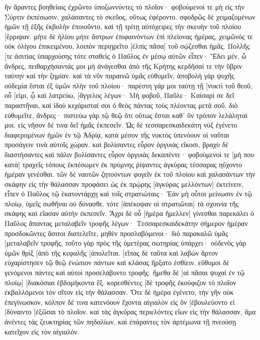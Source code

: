 ἣν ἄραντες βοηθείαις ἐχρῶντο ὑποζωννύντες τὸ πλοῖον· φοβούμενοί τε μὴ εἰς τὴν Σύρτιν ἐκπέσωσιν, χαλάσαντες τὸ σκεῦος, οὕτως ἐφέροντο. 
σφοδρῶς δὲ χειμαζομένων ἡμῶν τῇ ἑξῆς ἐκβολὴν ἐποιοῦντο, 
καὶ τῇ τρίτῃ αὐτόχειρες τὴν σκευὴν τοῦ πλοίου [ἔρριψαν. 
μήτε δὲ ἡλίου μήτε ἄστρων ἐπιφαινόντων ἐπὶ πλείονας ἡμέρας, χειμῶνός τε οὐκ ὀλίγου ἐπικειμένου, λοιπὸν περιῃρεῖτο [ἐλπὶς πᾶσα] τοῦ σῴζεσθαι ἡμᾶς. 
Πολλῆς [τε ἀσιτίας ὑπαρχούσης τότε σταθεὶς ὁ Παῦλος ἐν μέσῳ αὐτῶν εἶπεν· Ἔδει μέν, ὦ ἄνδρες, πειθαρχήσαντάς μοι μὴ ἀνάγεσθαι ἀπὸ τῆς Κρήτης κερδῆσαί τε τὴν ὕβριν ταύτην καὶ τὴν ζημίαν. 
καὶ τὰ νῦν παραινῶ ὑμᾶς εὐθυμεῖν, ἀποβολὴ γὰρ ψυχῆς οὐδεμία ἔσται ἐξ ὑμῶν πλὴν τοῦ πλοίου· 
παρέστη γάρ μοι ταύτῃ τῇ [νυκτὶ τοῦ θεοῦ, οὗ [εἰμι, ᾧ καὶ λατρεύω, [ἄγγελος 
λέγων· Μὴ φοβοῦ, Παῦλε· Καίσαρί σε δεῖ παραστῆναι, καὶ ἰδοὺ κεχάρισταί σοι ὁ θεὸς πάντας τοὺς πλέοντας μετὰ σοῦ. 
διὸ εὐθυμεῖτε, ἄνδρες· πιστεύω γὰρ τῷ θεῷ ὅτι οὕτως ἔσται καθ᾽ ὃν τρόπον λελάληταί μοι. 
εἰς νῆσον δέ τινα δεῖ ἡμᾶς ἐκπεσεῖν. 
Ὡς δὲ τεσσαρεσκαιδεκάτη νὺξ ἐγένετο διαφερομένων ἡμῶν ἐν τῷ Ἀδρίᾳ, κατὰ μέσον τῆς νυκτὸς ὑπενόουν οἱ ναῦται προσάγειν τινὰ αὐτοῖς χώραν. 
καὶ βολίσαντες εὗρον ὀργυιὰς εἴκοσι, βραχὺ δὲ διαστήσαντες καὶ πάλιν βολίσαντες εὗρον ὀργυιὰς δεκαπέντε· 
φοβούμενοί τε [μή που κατὰ] τραχεῖς τόπους ἐκπέσωμεν ἐκ πρύμνης ῥίψαντες ἀγκύρας τέσσαρας ηὔχοντο ἡμέραν γενέσθαι. 
τῶν δὲ ναυτῶν ζητούντων φυγεῖν ἐκ τοῦ πλοίου καὶ χαλασάντων τὴν σκάφην εἰς τὴν θάλασσαν προφάσει ὡς ἐκ πρῴρης [ἀγκύρας μελλόντων] ἐκτείνειν, 
εἶπεν ὁ Παῦλος τῷ ἑκατοντάρχῃ καὶ τοῖς στρατιώταις· Ἐὰν μὴ οὗτοι μείνωσιν ἐν τῷ πλοίῳ, ὑμεῖς σωθῆναι οὐ δύνασθε. 
τότε [ἀπέκοψαν οἱ στρατιῶται] τὰ σχοινία τῆς σκάφης καὶ εἴασαν αὐτὴν ἐκπεσεῖν. 
Ἄχρι δὲ οὗ [ἡμέρα ἤμελλεν] γίνεσθαι παρεκάλει ὁ Παῦλος ἅπαντας μεταλαβεῖν τροφῆς λέγων· Τεσσαρεσκαιδεκάτην σήμερον ἡμέραν προσδοκῶντες ἄσιτοι διατελεῖτε, μηθὲν προσλαβόμενοι· 
διὸ παρακαλῶ ὑμᾶς [μεταλαβεῖν τροφῆς, τοῦτο γὰρ πρὸς τῆς ὑμετέρας σωτηρίας ὑπάρχει· οὐδενὸς γὰρ ὑμῶν θρὶξ [ἀπὸ τῆς κεφαλῆς [ἀπολεῖται. 
[εἴπας δὲ ταῦτα καὶ λαβὼν ἄρτον εὐχαρίστησεν τῷ θεῷ ἐνώπιον πάντων καὶ κλάσας ἤρξατο ἐσθίειν. 
εὔθυμοι δὲ γενόμενοι πάντες καὶ αὐτοὶ προσελάβοντο τροφῆς. 
ἤμεθα δὲ [αἱ πᾶσαι ψυχαὶ ἐν τῷ πλοίῳ] [διακόσιαι ἑβδομήκοντα ἕξ. 
κορεσθέντες [δὲ τροφῆς ἐκούφιζον τὸ πλοῖον ἐκβαλλόμενοι τὸν σῖτον εἰς τὴν θάλασσαν. 
Ὅτε δὲ ἡμέρα ἐγένετο, τὴν γῆν οὐκ ἐπεγίνωσκον, κόλπον δέ τινα κατενόουν ἔχοντα αἰγιαλὸν εἰς ὃν [ἐβουλεύοντο εἰ [δύναιντο [ἐξῶσαι τὸ πλοῖον. 
καὶ τὰς ἀγκύρας περιελόντες εἴων εἰς τὴν θάλασσαν, ἅμα ἀνέντες τὰς ζευκτηρίας τῶν πηδαλίων, καὶ ἐπάραντες τὸν ἀρτέμωνα τῇ πνεούσῃ κατεῖχον εἰς τὸν αἰγιαλόν. 
